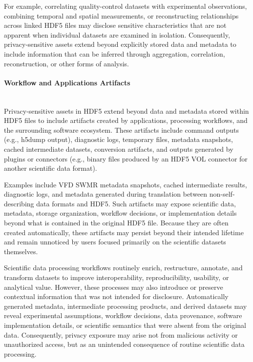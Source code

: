 \documentclass[../main.tex]{subfiles}
\begin{document}
For example, correlating quality-control datasets with experimental observations, combining 
temporal and spatial measurements, or reconstructing relationships across linked HDF5 files 
may disclose sensitive characteristics that are not apparent when individual datasets 
are examined in isolation. Consequently, privacy-sensitive assets extend beyond explicitly 
stored data and metadata to include information that can be inferred through aggregation, 
correlation, reconstruction, or other forms of analysis.

\paragraph{Workflow and Applications Artifacts}\mbox{}\\
Privacy-sensitive assets in HDF5 extend beyond data and metadata stored within HDF5 files 
to include artifacts created by applications, processing workflows, and the surrounding 
software ecosystem. These artifacts include command outputs (e.g., h5dump output), 
diagnostic logs, temporary files, metadata snapshots, cached intermediate datasets, 
conversion artifacts, and outputs generated by plugins or connectors 
(e.g., binary files produced by an HDF5 VOL connector for another scientific data format).

Examples include VFD SWMR metadata snapshots, cached intermediate results, diagnostic logs, 
and metadata generated during translation between non-self-describing data formats and HDF5. 
Such artifacts may expose scientific data, metadata, storage organization, workflow decisions, 
or implementation details beyond what is contained in the original HDF5 file. 
Because they are often created automatically, these artifacts may persist beyond their 
intended lifetime and remain unnoticed by users focused primarily on the scientific datasets themselves.

Scientific data processing workflows routinely enrich, restructure, annotate, and transform 
datasets to improve interoperability, reproducibility, usability, or analytical value. 
However, these processes may also introduce or preserve contextual information that was not intended for disclosure. 
Automatically generated metadata, intermediate processing products, and derived datasets may 
reveal experimental assumptions, workflow decisions, data provenance, software 
implementation details, or scientific semantics that were absent from the original data. 
Consequently, privacy exposure may arise not from malicious activity or unauthorized access, 
but as an unintended consequence of routine scientific data processing.
\end{document}
